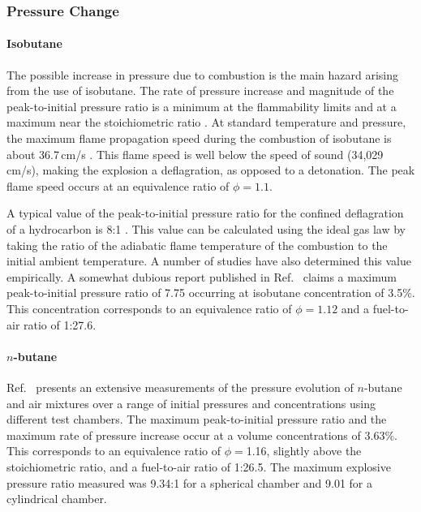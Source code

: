 \subsubsection{Pressure Change}
\paragraph{Isobutane} The possible increase in pressure due to combustion is the main hazard arising from the use of isobutane.  The rate of pressure increase and magnitude of the peak-to-initial pressure ratio is a minimum at the flammability limits and at a maximum near the stoichiometric ratio \cite{Zabetakis_1965}.
At standard temperature and pressure, the maximum flame propagation speed during the combustion of isobutane is about 36.7\,cm/s \cite{Davis_1998}.  This flame speed is well below the speed of sound (34,029\,cm/s), making the explosion a deflagration, as opposed to a detonation.  The peak flame speed occurs at an equivalence ratio of $\phi=1.1$.

A typical value of the peak-to-initial pressure ratio for the confined deflagration of a hydrocarbon is 8:1 \cite{Zabetakis_1965}.  This value can be calculated using the ideal gas law by taking the ratio of the adiabatic flame temperature of the combustion to the initial ambient temperature.  A number of studies have also determined this value empirically.
A somewhat dubious report published in Ref.~\cite{Zgliczynski_1994} claims a maximum peak-to-initial pressure ratio of 7.75 occurring at isobutane concentration of 3.5\%.  This concentration corresponds to an equivalence ratio of $\phi=1.12$ and a fuel-to-air ratio of 1:27.6.

\paragraph{$n$-butane} Ref.~\cite{Razus_2007} presents an extensive measurements of the pressure evolution of $n$-butane and air mixtures over a range of initial pressures and concentrations using different test chambers.  The maximum peak-to-initial pressure ratio and the maximum rate of pressure increase occur at a volume concentrations of 3.63\%.  This corresponds to an equivalence ratio of $\phi=$1.16, slightly above the stoichiometric ratio, and a fuel-to-air ratio of 1:26.5.  The maximum explosive pressure ratio measured was 9.34:1 for a spherical chamber and 9.01 for a cylindrical chamber.

